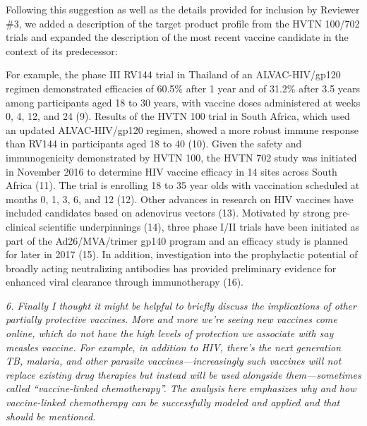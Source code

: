 \documentclass[12pt]{jpmletter}
\newenvironment{original}{\it}{}
\begin{document}
\begin{letter}{}
    Following this suggestion as well as the details provided for
    inclusion by Reviewer \#3, we added a description of the target
    product profile from the HVTN 100/702 trials and expanded the
    description of the most recent vaccine candidate in the context of
    its predecessor:
    \begin{quoting}
      For example, the phase III RV144 trial in Thailand of an
      ALVAC-HIV/gp120 regimen demonstrated efficacies of 60.5\% after
      1 year and of 31.2\% after 3.5 years among participants aged 18
      to 30 years, with vaccine doses administered at weeks 0, 4, 12,
      and 24 (9). Results of the HVTN 100 trial in South Africa,
      which used an updated ALVAC-HIV/gp120 regimen, showed a more
      robust immune response than RV144 in participants aged 18 to 40
      (10).  Given the safety and immunogenicity demonstrated by HVTN
      100, the HVTN 702 study was initiated in November 2016 to
      determine HIV vaccine efficacy in 14 sites across South Africa
      (11). The trial is enrolling 18 to 35 year olds with vaccination
      scheduled at months 0, 1, 3, 6, and 12 (12).  Other advances in
      research on HIV vaccines have included candidates based on
      adenovirus vectors (13).  Motivated by strong pre-clinical
      scientific underpinnings (14), three phase I/II trials have been
      initiated as part of the Ad26/MVA/trimer gp140 program and an
      efficacy study is planned for later in 2017 (15).  In addition,
      investigation into the prophylactic potential of broadly acting
      neutralizing antibodies has provided preliminary evidence for
      enhanced viral clearance through immunotherapy (16).
    \end{quoting}
    
    \begin{original}
      6. Finally I thought it might be helpful to briefly discuss the
      implications of other partially protective vaccines. More and
      more we're seeing new vaccines come online, which do not have
      the high levels of protection we associate with say measles
      vaccine. For example, in addition to HIV, there's the next
      generation TB, malaria, and other parasite vaccines—increasingly
      such vaccines will not replace existing drug therapies but
      instead will be used alongside them—sometimes called
      ``vaccine-linked chemotherapy''. The analysis here emphasizes
      why and how vaccine-linked chemotherapy can be successfully
      modeled and applied and that should be mentioned.
    \end{original}
    

\end{letter}
\end{document}

